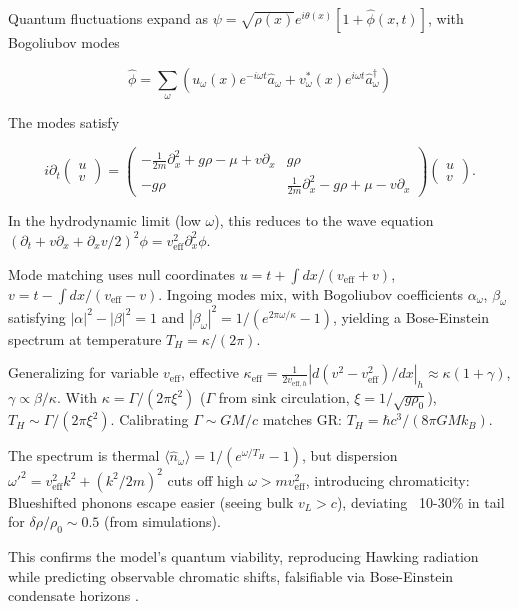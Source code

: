 \documentclass{article}
\begin{document}
Quantum fluctuations expand as $\psi = \sqrt{\rho(x)} e^{i \theta(x)} [1 + \hat{\phi}(x,t)]$, with Bogoliubov modes

\[
\hat{\phi} = \sum_\omega (u_\omega(x) e^{-i\omega t} \hat{a}_\omega + v_\omega^*(x) e^{i\omega t} \hat{a}_\omega^\dagger)
\]

The modes satisfy

\[
i \partial_t \begin{pmatrix} u \\ v \end{pmatrix} = \begin{pmatrix} -\frac{1}{2m} \partial_x^2 + g \rho - \mu + v \partial_x & g \rho \\ -g \rho & \frac{1}{2m} \partial_x^2 - g \rho + \mu - v \partial_x \end{pmatrix} \begin{pmatrix} u \\ v \end{pmatrix}.
\]

In the hydrodynamic limit (low $\omega$), this reduces to the wave equation $(\partial_t + v \partial_x + \partial_x v / 2)^2 \phi = v_{\text{eff}}^2 \partial_x^2 \phi$.

Mode matching uses null coordinates $u = t + \int dx / (v_{\text{eff}} + v)$, $v = t - \int dx / (v_{\text{eff}} - v)$. Ingoing modes mix, with Bogoliubov coefficients $\alpha_\omega$, $\beta_\omega$ satisfying $|\alpha|^2 - |\beta|^2 = 1$ and $|\beta_\omega|^2 = 1 / (e^{2\pi \omega / \kappa} - 1)$, yielding a Bose-Einstein spectrum at temperature $T_H = \kappa / (2\pi)$.

Generalizing for variable $v_{\text{eff}}$, effective $\kappa_{\text{eff}} = \frac{1}{2 v_{\text{eff},h}} | d(v^2 - v_{\text{eff}}^2)/dx |_h \approx \kappa (1 + \gamma)$, $\gamma \propto \beta / \kappa$. With $\kappa = \Gamma / (2\pi \xi^2)$ ($\Gamma$ from sink circulation, $\xi = 1 / \sqrt{g \rho_0}$), $T_H \sim \Gamma / (2\pi \xi^2)$. Calibrating $\Gamma \sim G M / c$ matches GR: $T_H = \hbar c^3 / (8\pi G M k_B)$.

The spectrum is thermal $\langle \hat{n}_\omega \rangle = 1 / (e^{\omega / T_H} - 1)$, but dispersion $\omega'^2 = v_{\text{eff}}^2 k^2 + (k^2 / 2m)^2$ cuts off high $\omega > m v_{\text{eff}}^2$, introducing chromaticity: Blueshifted phonons escape easier (seeing bulk $v_L > c$), deviating ~10-30\% in tail for $\delta \rho / \rho_0 \sim 0.5$ (from simulations).

This confirms the model's quantum viability, reproducing Hawking radiation while predicting observable chromatic shifts, falsifiable via Bose-Einstein condensate horizons \cite{steinhauer2016observation}.
\end{document}
